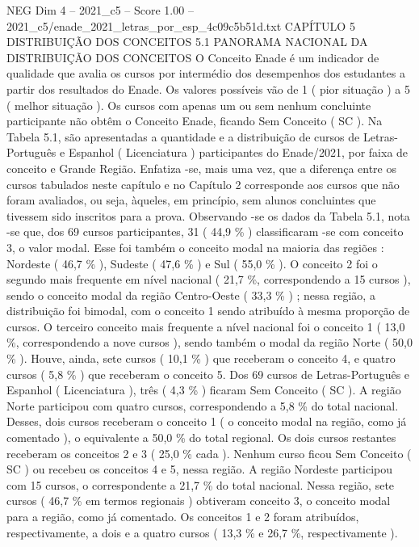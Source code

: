 \begin{textsample}{NEG Dim 4 – 2021\_c5 – Score 1.00 – 2021\_c5/enade\_2021\_letras\_por\_esp\_4c09c5b51d.txt}  \label{ex:f4_neg_141}
CAPÍTULO 5 DISTRIBUIÇÃO DOS CONCEITOS 5.1 PANORAMA NACIONAL DA DISTRIBUIÇÃO DOS CONCEITOS O Conceito Enade é um indicador de qualidade que avalia os cursos por intermédio dos desempenhos dos estudantes a partir dos resultados do Enade.
Os valores possíveis vão de 1 ( pior situação ) a 5 ( melhor situação ).
Os cursos com apenas um ou sem nenhum concluinte participante não obtêm o Conceito Enade, ficando Sem Conceito ( SC ).
Na Tabela 5.1, são apresentadas a quantidade e a distribuição de cursos de Letras-Português e Espanhol ( Licenciatura ) participantes do Enade/2021, por faixa de conceito e Grande Região.
Enfatiza -se, mais uma vez, que a diferença entre os cursos tabulados neste capítulo e no Capítulo 2 corresponde aos cursos que não foram avaliados, ou seja, àqueles, em princípio, sem alunos concluintes que tivessem sido inscritos para a prova.
Observando -se os dados da Tabela 5.1, nota -se que, dos 69 cursos participantes, 31 ( 44,9 \% ) classificaram -se com conceito 3, o valor modal.
Esse foi também o conceito modal na maioria das regiões : Nordeste ( 46,7 \% ), Sudeste ( 47,6 \% ) e Sul ( 55,0 \% ).
O conceito 2 foi o segundo mais frequente em nível nacional ( 21,7 \%, correspondendo a 15 cursos ), sendo o conceito modal da região Centro-Oeste ( 33,3 \% ) ; nessa região, a distribuição foi bimodal, com o conceito 1 sendo atribuído à mesma proporção de cursos.
O terceiro conceito mais frequente a nível nacional foi o conceito 1 ( 13,0 \%, correspondendo a nove cursos ), sendo também o modal da região Norte ( 50,0 \% ).
Houve, ainda, sete cursos ( 10,1 \% ) que receberam o conceito 4, e quatro cursos ( 5,8 \% ) que receberam o conceito 5.
Dos 69 cursos de Letras-Português e Espanhol ( Licenciatura ), três ( 4,3 \% ) ficaram Sem Conceito ( SC ).
A região Norte participou com quatro cursos, correspondendo a 5,8 \% do total nacional.
Desses, dois cursos receberam o conceito 1 ( o conceito modal na região, como já comentado ), o equivalente a 50,0 \% do total regional.
Os dois cursos restantes receberam os conceitos 2 e 3 ( 25,0 \% cada ).
Nenhum curso ficou Sem Conceito ( SC ) ou recebeu os conceitos 4 e 5, nessa região.
A região Nordeste participou com 15 cursos, o correspondente a 21,7 \% do total nacional.
Nessa região, sete cursos ( 46,7 \% em termos regionais ) obtiveram conceito 3, o conceito modal para a região, como já comentado.
Os conceitos 1 e 2 foram atribuídos, respectivamente, a dois e a quatro cursos ( 13,3 \% e 26,7 \%, respectivamente ).

\end{textsample}
